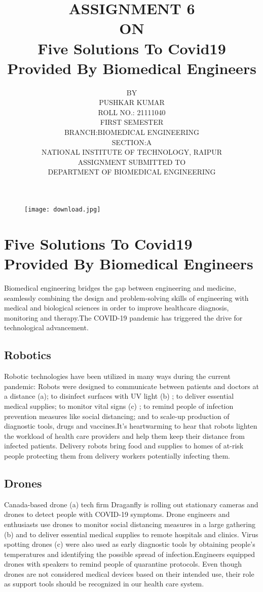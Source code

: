 \documentclass{article}
\title{ASSIGNMENT 6\\ON\\ Five Solutions To Covid19 Provided By Biomedical Engineers​}
\author{BY\\PUSHKAR KUMAR\\ROLL NO.: 21111040\\FIRST SEMESTER\\BRANCH:BIOMEDICAL ENGINEERING\\SECTION:A\\NATIONAL INSTITUTE OF TECHNOLOGY, RAIPUR\\ASSIGNMENT SUBMITTED TO\\
DEPARTMENT OF BIOMEDICAL ENGINEERING}
\date{}
\begin{document}
\maketitle
\begin{figure}[h]
    \centering
    \texttt{[image: download.jpg]}
\end{figure}

\section{ Five Solutions To Covid19 Provided By Biomedical Engineers​
}

 Biomedical engineering bridges the gap between engineering and medicine, seamlessly combining the design and problem-solving skills of engineering with medical and biological sciences in order to improve healthcare diagnosis, monitoring and therapy.The COVID-19 pandemic has triggered the drive for technological advancement. 
 
 \subsection{Robotics}
 Robotic technologies have been utilized in many ways during the current pandemic: Robots were designed to communicate between patients and doctors at a distance (a); to disinfect surfaces with UV light (b) ; to deliver essential  medical supplies; to monitor vital signs (c) ; to remind people of infection prevention measures like social distancing; and to scale-up production of  diagnostic tools, drugs and vaccines.It’s heartwarming to hear that robots lighten the workload of health care providers and help them keep their distance from infected patients.  Delivery robots bring food and supplies to homes of at-risk people protecting them from delivery workers potentially infecting them. 
 
 \subsection{ Drones}
 Canada-based drone (a) tech firm Draganfly is rolling out stationary cameras and drones to detect people with COVID-19 symptoms. Drone engineers and enthusiasts use drones to monitor social distancing measures in a large gathering (b) and to deliver essential medical supplies to remote hospitals and clinics.  Virus spotting drones (c) were also used as early diagnostic tools by obtaining people’s temperatures and identifying the possible spread of infection.Engineers equipped drones with speakers to remind people of quarantine protocols. Even though drones are not considered medical devices based on their intended use, their role as support tools should be recognized in our health care system.
\end{document}
